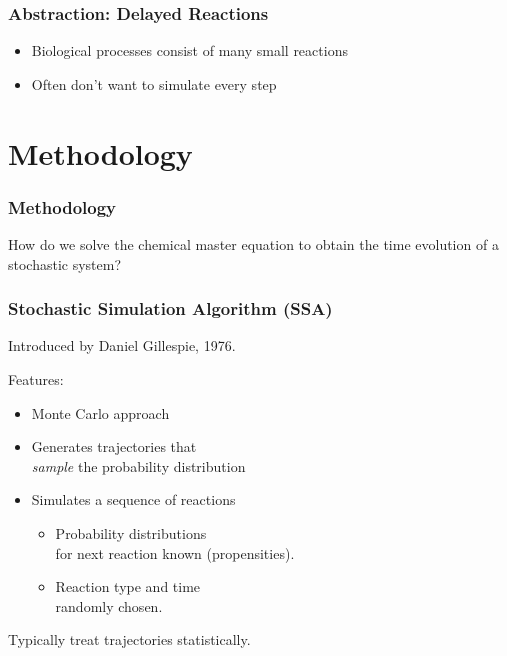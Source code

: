 \documentclass[xcolor={usenames,dvipsnames,svgnames}]{beamer}
\begin{document}
\begin{frame}
    \frametitle{Abstraction: Delayed Reactions}
    \begin{itemize}
        \item Biological processes consist of many small reactions
        \item Often don't want to simulate every step
    \end{itemize}
    \begin{center}
        
    \end{center}
    \pause

\end{frame}


\section{Methodology} %
\label{sec:methodology}

\begin{frame}
    \frametitle{Methodology}
    How do we solve the chemical master equation to obtain the time evolution of a stochastic system?
\end{frame}

\begin{frame}
    \frametitle{Stochastic Simulation Algorithm (SSA)}
    Introduced by Daniel Gillespie, 1976.

    Features:
    \begin{itemize}
        \item Monte Carlo approach
        \item Generates trajectories that\\
            \emph{sample} the probability distribution
        \item Simulates a sequence of reactions
        \begin{itemize}
            \item Probability distributions\\
                for next reaction known (propensities).
            \item Reaction type and time\\
                randomly chosen.
        \end{itemize}
    \end{itemize}
    Typically treat trajectories statistically.
\end{frame}
\end{document}
